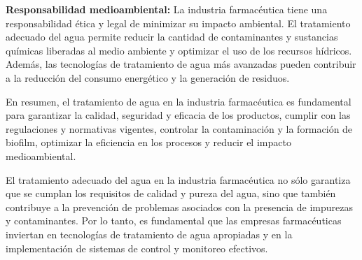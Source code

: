 \textbf{Responsabilidad medioambiental:} La industria farmacéutica tiene una responsabilidad ética y legal de minimizar su impacto ambiental. El tratamiento adecuado del agua permite reducir la cantidad de contaminantes y sustancias químicas liberadas al medio ambiente y optimizar el uso de los recursos hídricos. Además, las tecnologías de tratamiento de agua más avanzadas pueden contribuir a la reducción del consumo energético y la generación de residuos.

En resumen, el tratamiento de agua en la industria farmacéutica es fundamental para garantizar la calidad, seguridad y eficacia de los productos, cumplir con las regulaciones y normativas vigentes, controlar la contaminación y la formación de biofilm, optimizar la eficiencia en los procesos y reducir el impacto medioambiental.

El tratamiento adecuado del agua en la industria farmacéutica no sólo garantiza que se cumplan los requisitos de calidad y pureza del agua, sino que también contribuye a la prevención de problemas asociados con la presencia de impurezas y contaminantes. Por lo tanto, es fundamental que las empresas farmacéuticas inviertan en tecnologías de tratamiento de agua apropiadas y en la implementación de sistemas de control y monitoreo efectivos.

